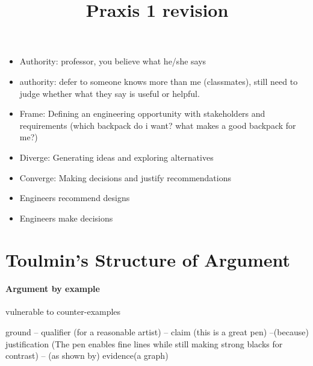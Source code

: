 \documentclass[12pt]{article}
\title{ Praxis 1 revision}
\begin{document}
\maketitle

\begin{itemize}

\item Authority: professor, you believe what he/she says
\item authority: defer to someone knows more than me (classmates), still need to judge whether what they say is useful or helpful.
\item Frame: Defining an engineering opportunity with stakeholders and requirements (which backpack do i want? what makes a good backpack for me?)
\item Diverge: Generating ideas and exploring alternatives
\item Converge: Making decisions and justify recommendations
\item Engineers recommend designs
\item Engineers make decisions

\end{itemize}

\section{Toulmin's Structure of Argument}

\paragraph{Argument by example}

vulnerable to counter-examples

ground -- qualifier (for a reasonable artist) -- claim (this is a great pen) --(because) justification (The pen enables fine lines while still making strong blacks for contrast) -- (as shown by) evidence(a graph)
\end{document}

